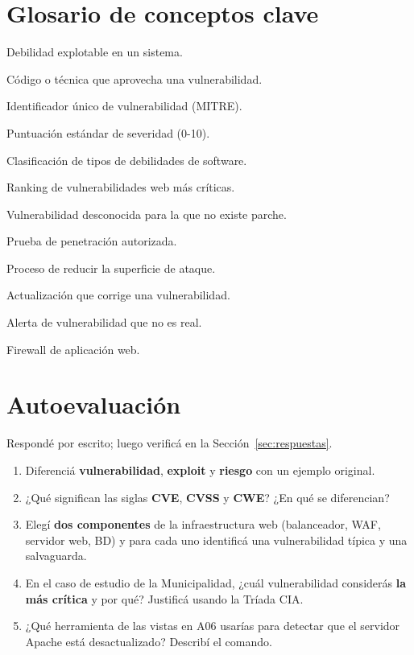 \documentclass[11pt,a4paper]{article}
\begin{document}
\section{Glosario de conceptos clave}
\begin{description}[leftmargin=!, labelwidth=3.5cm, font=\bfseries]
  \item[Vulnerabilidad] Debilidad explotable en un sistema.
  \item[Exploit] Código o técnica que aprovecha una vulnerabilidad.
  \item[CVE] Identificador único de vulnerabilidad (MITRE).
  \item[CVSS] Puntuación estándar de severidad (0-10).
  \item[CWE] Clasificación de tipos de debilidades de software.
  \item[OWASP Top 10] Ranking de vulnerabilidades web más críticas.
  \item[Zero-day] Vulnerabilidad desconocida para la que no existe parche.
  \item[Pentesting] Prueba de penetración autorizada.
  \item[Hardening] Proceso de reducir la superficie de ataque.
  \item[Parche] Actualización que corrige una vulnerabilidad.
  \item[Falso positivo] Alerta de vulnerabilidad que no es real.
  \item[WAF] Firewall de aplicación web.
\end{description}

\section{Autoevaluación}\label{sec:autoeval}
Respondé por escrito; luego verificá en la Sección~\ref{sec:respuestas}.

\begin{enumerate}[leftmargin=*]
  \item Diferenciá \textbf{vulnerabilidad}, \textbf{exploit} y \textbf{riesgo} con un ejemplo original.
  \item ¿Qué significan las siglas \textbf{CVE}, \textbf{CVSS} y \textbf{CWE}? ¿En qué se diferencian?
  \item Elegí \textbf{dos componentes} de la infraestructura web (balanceador, WAF, servidor web, BD) y para cada uno identificá una vulnerabilidad típica y una salvaguarda.
  \item En el caso de estudio de la Municipalidad, ¿cuál vulnerabilidad considerás \textbf{la más crítica} y por qué? Justificá usando la Tríada CIA.
  \item ¿Qué herramienta de las vistas en A06 usarías para detectar que el servidor Apache está desactualizado? Describí el comando.
\end{enumerate}
\end{document}
